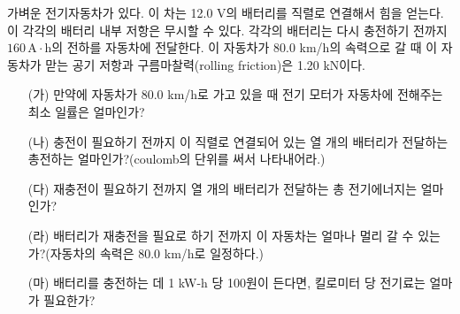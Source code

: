 \documentclass[tightenlines,floatfix,nofootinbib,superscriptaddress,fleqn]{revtex4-2}
\begin{document}
가벼운 전기자동차가 있다. 이 차는 12.0 V의 배터리를 직렬로 연결해서
힘을 얻는다. 이 각각의 배터리 내부 저항은 무시할 수 있다. 각각의
배터리는 다시 충전하기 전까지 $160\,\mathrm{A\cdot h}$의 전하를
자동차에 전달한다. 이 자동차가 80.0 km/h의 속력으로 갈 때 이 자동차가
맏는 공기 저항과 구름마찰력(rolling friction)은 1.20 kN이다. 
\begin{itemize}
\item[(가)] 만약에 자동차가 80.0 km/h로 가고 있을 때 전기 모터가
  자동차에 전해주는 최소 일률은 얼마인가?
\item[(나)] 충전이 필요하기 전까지 이 직렬로 연결되어 있는 열 개의
  배터리가 전달하는 총전하는 얼마인가?(coulomb의 단위를 써서
  나타내어라.) 
\item[(다)] 재충전이 필요하기 전까지 열 개의 배터리가 전달하는 총
  전기에너지는 얼마인가? 
\item[(라)] 배터리가 재충전을 필요로 하기 전까지 이 자동차는 얼마나
  멀리 갈 수 있는가?(자동차의 속력은 80.0 km/h로 일정하다.)
\item[(마)] 배터리를 충전하는 데 1 kW-h 당 100원이 든다면, 킬로미터 당
  전기료는 얼마가 필요한가? 
\end{itemize}

\vspace{1.cm}
\vspace{1.cm}
\end{document}
